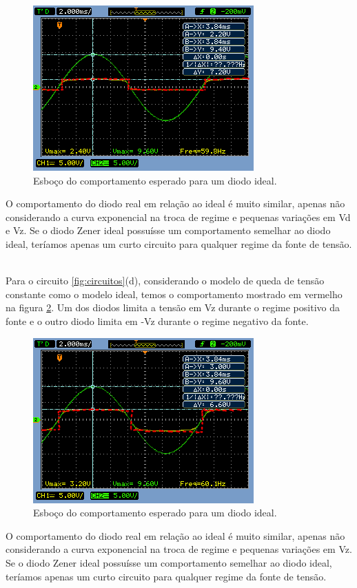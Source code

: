 \documentclass{abntex2}
\begin{document}
\begin{figure}[h]
  \centering
  \includegraphics[scale = .7]{circuito-1c-esboco.png}
  \caption{Esboço do comportamento esperado para um diodo ideal.}
  \label{fig:comp3}
\end{figure}
\pagebreak
O comportamento do diodo real em relação ao ideal é muito similar, apenas não considerando a curva exponencial na troca de regime e pequenas variações em Vd e Vz.
Se o diodo Zener ideal possuísse um comportamento semelhar ao diodo ideal, teríamos apenas um curto circuito para qualquer regime da fonte de tensão.

\\Para o circuito \ref{fig:circuitos}(d), considerando o modelo de queda de tensão constante como o modelo ideal, temos o comportamento mostrado em vermelho na figura \ref{fig:comp4}.
Um dos diodos limita a tensão em Vz durante o regime positivo da fonte e o outro diodo limita em -Vz durante o regime negativo da fonte.

\begin{figure}[h]
  \centering
  \includegraphics[scale = .7]{circuito-1d-esboco.png}
  \caption{Esboço do comportamento esperado para um diodo ideal.}
  \label{fig:comp4}
\end{figure}

O comportamento do diodo real em relação ao ideal é muito similar, apenas não considerando a curva exponencial na troca de regime e pequenas variações em Vz.
Se o diodo Zener ideal possuísse um comportamento semelhar ao diodo ideal, teríamos apenas um curto circuito para qualquer regime da fonte de tensão.
\end{document}
